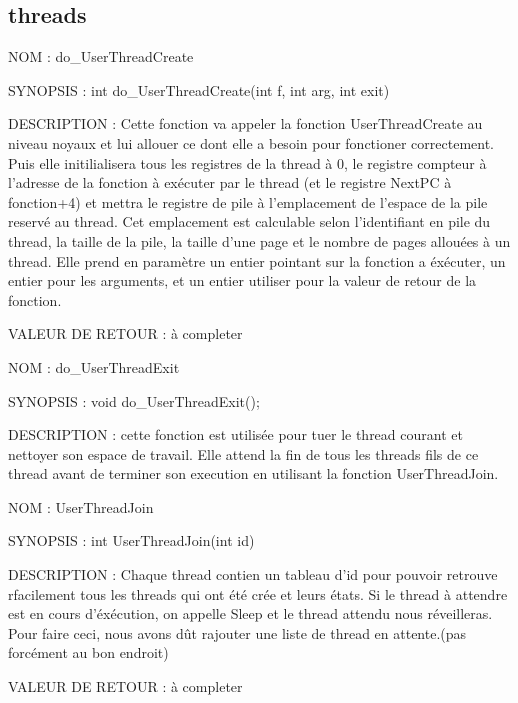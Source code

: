 \documentclass{report}
\begin{document}
	\subsection{threads}
	\begin{description}
		\item{NOM : } do\_UserThreadCreate
		\item{SYNOPSIS : } int do\_UserThreadCreate(int f, int arg, int exit)
		\item{DESCRIPTION : } Cette fonction va appeler la fonction UserThreadCreate au niveau noyaux et lui allouer ce dont elle a besoin pour fonctioner correctement. Puis elle initilialisera tous les registres de la thread à 0, le registre compteur à l'adresse de la fonction à exécuter par le thread (et le registre NextPC à fonction+4) et mettra le registre de pile à l'emplacement de l'espace de la pile reservé au thread. Cet emplacement est calculable selon l'identifiant en pile du thread, la taille de la pile, la taille d'une page et le nombre de pages allouées à un thread. Elle prend en paramètre un entier pointant sur la fonction a éxécuter, un entier pour les arguments, et un entier utiliser pour la valeur de retour de la fonction.
		\item{VALEUR DE RETOUR : } à completer
	\end{description}
	\begin{description}
		\item{NOM : } do\_UserThreadExit
		\item{SYNOPSIS : } void do\_UserThreadExit();
		\item{DESCRIPTION : } cette fonction est utilisée pour tuer le thread courant et nettoyer son espace de travail. Elle attend la fin de tous les threads fils de ce thread avant de terminer son execution en utilisant la fonction UserThreadJoin.
	\end{description}
	\begin{description}
		\item{NOM : } UserThreadJoin
		\item{SYNOPSIS : } int UserThreadJoin(int id)
		\item{DESCRIPTION : } Chaque thread contien un tableau d'id pour pouvoir retrouve rfacilement tous les threads qui ont été crée et leurs états. Si le thread à attendre est en cours d'éxécution, on appelle Sleep et le thread attendu nous réveilleras. Pour faire ceci, nous avons dût rajouter une liste de thread en attente.(pas forcément au bon endroit)
		\item{VALEUR DE RETOUR : } à completer
	\end{description}
\end{document}

